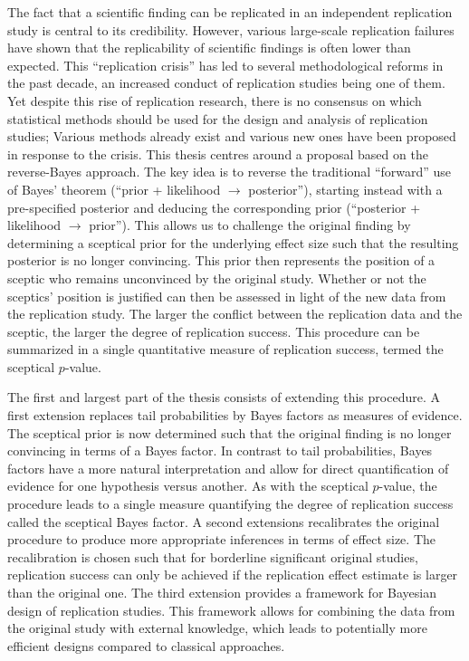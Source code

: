 The fact that a scientific finding can be replicated in an independent
replication study is central to its credibility. However, various large-scale
replication failures have shown that the replicability of scientific findings is
often lower than expected. This ``replication crisis'' has led to several
methodological reforms in the past decade, an increased conduct of replication
studies being one of them. Yet despite this rise of replication research, there
is no consensus on which statistical methods should be used for the design and
analysis of replication studies; Various methods already exist and various new
ones have been proposed in response to the crisis. This thesis centres around a
proposal based on the reverse-Bayes approach. The key idea is to reverse the
traditional ``forward'' use of Bayes' theorem (``prior + likelihood
$\rightarrow$ posterior''), starting instead with a pre-specified posterior and
deducing the corresponding prior (``posterior + likelihood $\rightarrow$
prior''). %
This allows us to challenge the original finding by determining a sceptical
prior for the underlying effect size such that the resulting posterior is no
longer convincing. This prior then represents the position of a sceptic who
remains unconvinced by the original study. Whether or not the sceptics' position
is justified can then be assessed in light of the new data from the replication
study. The larger the conflict between the replication data and the sceptic, the
larger the degree of replication success. This procedure can be summarized in a
single quantitative measure of replication success, termed the sceptical
$p$-value.

The first and largest part of the thesis consists of extending this procedure. A
first extension replaces tail probabilities by Bayes factors as measures of
evidence. The sceptical prior is now determined such that the original finding
is no longer convincing in terms of a Bayes factor. In contrast to tail
probabilities, Bayes factors have a more natural interpretation and allow for
direct quantification of evidence for one hypothesis versus another. As with the
sceptical $p$-value, the procedure leads to a single measure quantifying the
degree of replication success called the sceptical Bayes factor. A second
extensions recalibrates the original procedure to produce more appropriate
inferences in terms of effect size. %
The recalibration is chosen such that for borderline significant original
studies, replication success can only be achieved if the replication effect
estimate is larger than the original one. The third extension provides a
framework for Bayesian design of replication studies. This framework allows for
combining the data from the original study with external knowledge, which leads
to potentially more efficient designs compared to classical approaches.

